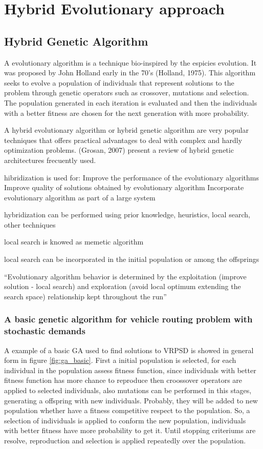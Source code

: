 \chapter{Hybrid Evolutionary approach}
\label{chap:methodology}



\section{Hybrid Genetic Algorithm}

A evolutionary algorithm is a technique bio-inspired by the espicies evolution. It was proposed by John Holland early in the 70's (Holland, 1975). This algorithm seeks to evolve a population of individuals that represent solutions to the problem through genetic operators such as crossover, mutations and selection. The population generated in each iteration is evaluated and then the individuals with a better fitness are chosen for the next generation with more probability.

A hybrid evolutionary algorithm or hybrid genetic algorithm are very popular techniques that offers practical advantages to deal with complex and hardly optimization problems. (Grosan, 2007) present a review of hybrid genetic architectures frecuently used.




hibridization is used for:
Improve the performance of the evolutionary algorithms
Improve quality of solutions obtained by evolutionary algorithm
Incorporate evolutionary algorithm as part of a large system

hybridization can be performed using prior knowledge, heuristics, local search, other techniques

local search is knowed as memetic algorithm

local search can be incorporated in the initial population or among the offsprings


``Evolutionary algorithm behavior is determined by the exploitation (improve solution - local search) and exploration (avoid local optimum extending the search space) relationship kept throughout the run''


\subsection{A basic genetic algorithm for vehicle routing problem with stochastic demands}

A example of a basic GA used to find solutions to VRPSD is showed in general form in figure \ref{fig:ga_basic}. First a initial population is selected, for each individual in the population assess fitness function, since individuals with better fitness function has more chance to reproduce then croossover operators are applied to selected individuals, also mutations can be performed in this stages, generating a offspring with new individuals. Probably, they will be added to new population whether have a fitness competitive respect to the population. So, a selection of individuals is applied to conform the new population, individuals with better fitness have more probability to get it. Until stopping criteriums are resolve, reproduction and selection is applied repeatedly over the population.

